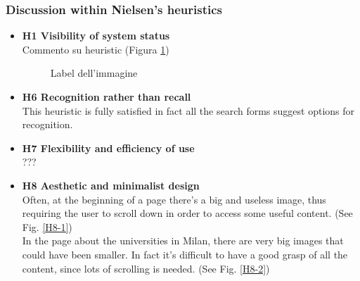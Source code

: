 \subsubsection{Discussion within Nielsen's heuristics}
\begin{itemize}
    \item \textbf{H1 Visibility of system status}\\
    Commento su heuristic (Figura \ref{fig:1-image-ref})
    \begin{figure}[!ht]
        \begin{minipage}{\linewidth}
            \centering
            \captionsetup{justification=centering}
            \caption{Label dell'immagine}
            \label{fig:1-image-ref}
        \end{minipage}
    \end{figure}
    \item \textbf{H6 Recognition rather than recall}\\
    This heuristic is fully satisfied in fact all the search forms suggest options for recognition.
    \item \textbf{H7 Flexibility and efficiency of use}\\
    ???
    \item \textbf{H8 Aesthetic and minimalist design}\\
    Often, at the beginning of a page there's a big and useless image, thus requiring the user to scroll down in order to access some useful content. (See Fig. \ref{H8-1})\\
    In the page about the universities in Milan, there are very big images that could have been smaller. In fact it's difficult to have a good grasp of all the content, since lots of scrolling is needed. (See Fig. \ref{H8-2})
\begin{figure}[!ht]
            \begin{minipage}{\linewidth}
                \centering

\end{minipage}
\end{figure}
\end{itemize}
